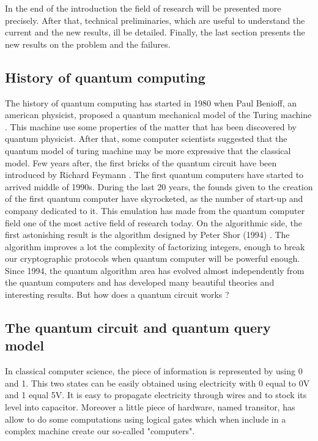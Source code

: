 \documentclass[11pt,a4paper]{article}
\theoremstyle{definition}
\theoremstyle{plain}
\theoremstyle{definition}
\begin{document}
In the end of the introduction the field of research will be presented more precisely.
After that, technical preliminaries, which are useful to understand the
current and the new results, ill be detailed. Finally, the last section presents the
new results on the problem and the failures.

\subsection{History of quantum computing}

The history of quantum computing has started in 1980 when Paul Benioff, an american physicist,
proposed a quantum mechanical model of the Turing machine \cite{art:paulbenioff}.
This machine use some properties
of the matter that has been discovered by quantum physicist. After that, some computer
scientists suggested that the quantum model of turing machine may be more expressive that the
classical model. Few years after, the first bricks of the quantum circuit have been introduced
by Richard Feymann \cite{art:feymann}. The first quantum computers have started to arrived middle
of 1990s. During the last 20 years, the founds given to the creation of the first quantum computer
have skyrocketed, as the number of start-up and company dedicated to it. This emulation has made
from the quantum computer
field one of the most active field of research today. On the algorithmic side, the first
astonishing result is the algorithm designed by Peter Shor (1994) \cite{art:shor}. The
algorithm improves a lot the complexity of factorizing integers, enough to break our
cryptographic protocols when quantum computer will be powerful enough. Since 1994, the
quantum algorithm area has evolved almost independently from the quantum computers and
has developed many beautiful theories and interesting results. But how does a quantum
circuit works ?

\subsection{The quantum circuit and quantum query model}

In classical computer science, the piece of information is represented by using
0 and 1. This two states can be easily obtained using electricity with 0 equal to 0V
and 1 equal 5V. It is easy to propagate electricity through wires and to stock its
level into capacitor. Moreover a little piece of hardware, named transitor, has allow to do some
computations using logical gates which when include in a complex machine create our
so-called "computers".
\end{document}

